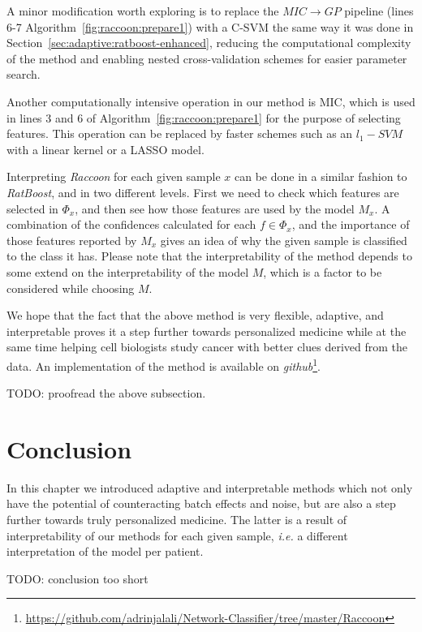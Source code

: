 A minor modification worth exploring is to replace the $MIC \rightarrow GP$ pipeline (lines 6-7 Algorithm~\ref{fig:raccoon:prepare1}) with a C-SVM the same way it was done in Section~\ref{sec:adaptive:ratboost-enhanced}, reducing the computational complexity of the method and enabling nested cross-validation schemes for easier parameter search.

Another computationally intensive operation in our method is MIC, which is used in lines 3 and 6 of Algorithm~\ref{fig:raccoon:prepare1} for the purpose of selecting features. This operation can be replaced by faster schemes such as an $l_1-SVM$ with a linear kernel or a LASSO model.

Interpreting \emph{Raccoon} for each given sample $x$ can be done in a similar fashion to \emph{RatBoost}, and in two different levels. First we need to check which features are selected in $\Phi_x$, and then see how those features are used by the model $M_x$. A combination of the confidences calculated for each $f \in \Phi_x$, and the importance of those features reported by $M_x$ gives an idea of why the given sample is classified to the class it has. Please note that the interpretability of the method depends to some extend on the interpretability of the model $M$, which is a factor to be considered while choosing $M$.

We hope that the fact that the above method is very flexible, adaptive, and interpretable proves it a step further towards personalized medicine while at the same time helping cell biologists study cancer with better clues derived from the data. An implementation of the method is available on \emph{github}\footnote{\url{https://github.com/adrinjalali/Network-Classifier/tree/master/Raccoon}}.

TODO: proofread the above subsection.

\section{Conclusion}
In this chapter we introduced adaptive and interpretable methods which not only have the potential of counteracting batch effects and noise, but are also a step further towards truly personalized medicine. The latter is a result of interpretability of our methods for each given sample, \emph{i.e.} a different interpretation of the model per patient.

TODO: conclusion too short
